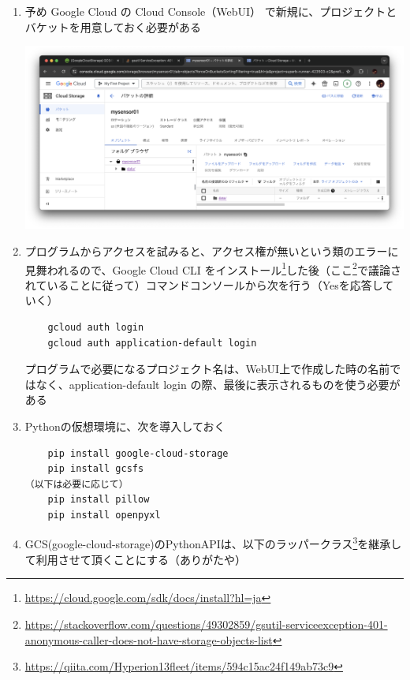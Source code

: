 \documentclass[12pt,a4paper,uplatex]{jsarticle}
\begin{document}
\begin{enumerate}

\item 予め Google Cloud の Cloud Console（WebUI） で新規に、プロジェクトとバケットを用意しておく必要がある


\includegraphics[keepaspectratio, scale=0.26]{figs/png/cloud2.png}

\item プログラムからアクセスを試みると、アクセス権が無いという類のエラーに見舞われるので、Google Cloud CLI をインストール\footnote{\url{https://cloud.google.com/sdk/docs/install?hl=ja}}した後（ここ\footnote{\url{https://stackoverflow.com/questions/49302859/gsutil-serviceexception-401-anonymous-caller-does-not-have-storage-objects-list}}で議論されていることに従って）コマンドコンソールから次を行う（Yesを応答していく）
\begin{verbatim}
	gcloud auth login
	gcloud auth application-default login
\end{verbatim}

プログラムで必要になるプロジェクト名は、WebUI上で作成した時の名前ではなく、application-default login の際、最後に表示されるものを使う必要がある

\item Pythonの仮想環境に、次を導入しておく
\begin{verbatim}
	pip install google-cloud-storage
	pip install gcsfs
（以下は必要に応じて）
	pip install pillow
	pip install openpyxl
\end{verbatim}

\item GCS(google-cloud-storage)のPythonAPIは、以下のラッパークラス\footnote{	\url{https://qiita.com/Hyperion13fleet/items/594c15ac24f149ab73c9}
}を継承して利用させて頂くことにする（ありがたや）

\end{enumerate}
\end{document}
